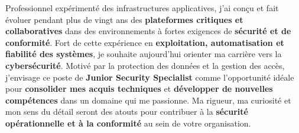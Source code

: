 \par{
Professionnel expérimenté des infrastructures applicatives, j’ai conçu et fait évoluer pendant plus de vingt ans des \textbf{plateformes critiques et collaboratives} dans des environnements à fortes exigences de \textbf{sécurité et de conformité}.
Fort de cette expérience en \textbf{exploitation, automatisation et fiabilité des systèmes}, je souhaite aujourd’hui orienter ma carrière vers la \textbf{cybersécurité}.
Motivé par la protection des données et la gestion des accès, j’envisage ce poste de \textbf{Junior Security Specialist} comme l’opportunité idéale pour \textbf{consolider mes acquis techniques} et \textbf{développer de nouvelles compétences} dans un domaine qui me passionne.
Ma rigueur, ma curiosité et mon sens du détail seront des atouts pour contribuer à la \textbf{sécurité opérationnelle et à la conformité} au sein de votre organisation.
}